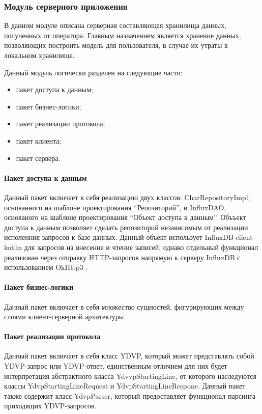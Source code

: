 \subsubsection{Модуль серверного приложения}
В данном модуле описана серверная составляющая хранилища данных, полученных от оператора. Главным назначением является хранение данных, позволяющих построить модель для пользователя, в случае их утраты в локальном хранилище.

Данный модуль логически разделен на следующие части:

\begin{itemize}[leftmargin=1.6\parindent]
\item пакет доступа к данным;
\item пакет бизнес-логики;
\item пакет реализации протокола;
\item пакет клиента;
\item пакет сервера.
\end{itemize}

\paragraph{Пакет доступа к данным \newline}
Данный пакет включает в себя реализацию двух классов: CharRepositoryImpl, основанного на шаблоне проектирования ``Репозиторий'', и InfluxDAO, основаного на шаблоне проектирования ``Объект доступа к данным''. Объъект доступа к данным позволяет сделать репозиторий независимым от реализации исполенния запросов к базе данных. Данный объект использует InfluxDB-client-kotlin \cite{influxClientKotlin} для запросов на внесение и чтение записей, однако отдельный функционал реализован через отправку HTTP-запросов напрямую к серверу InfluxDB с использованием OkHttp3 \cite{OkHttp}.

\paragraph{Пакет бизнес-логики \newline}
Данный пакет включает в себя множество сущностей, фигурирующих между слоями клиент-серверной архитектуры.

\paragraph{Пакет реализации протокола \newline}
Данный пакет включает в себя класс YDVP, который может представлять собой YDVP-запрос или YDVP-ответ, единственным отличием для них будет интерпретация абстрактного класса YdvvpStartingLine, от которого наследуются классы YdvpStartingLineRequest и YdvpStartingLineRespone. Данный пакет также содержит класс YdvpParser, который предоставляет функционал парсинга приходящих YDVP-запросов.

